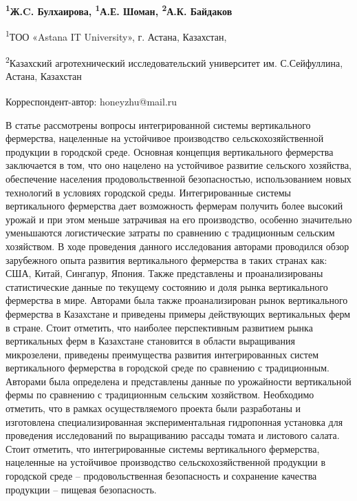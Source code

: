 
\begin{articleheader}

{\bfseries
\textsuperscript{1}Ж.C. Булхаирова\textsuperscript{\envelope },
\textsuperscript{1}А.Е. Шоман,
\textsuperscript{2}А.К. Байдаков
}
\end{articleheader}

\begin{affiliation}
\textsuperscript{1}ТОО «Astana IT University», г. Астана, Казахстан,

\textsuperscript{2}Казахский агротехнический исследовательский университет им. С.Сейфуллина, Астана, Казахстан

\raggedright \textsuperscript{\envelope }Корреспондент-автор: honeyzhu@mail.ru
\end{affiliation}

В статье рассмотрены вопросы интегрированной системы вертикального
фермерства, нацеленные на устойчивое производство сельскохозяйственной
продукции в городской среде. Основная концепция вертикального фермерства
заключается в том, что оно нацелено на устойчивое развитие сельского
хозяйства, обеспечение населения продовольственной безопасностью,
использованием новых технологий в условиях городской среды.
Интегрированные системы вертикального фермерства дает возможность
фермерам получить более высокий урожай и при этом меньше затрачивая на
его производство, особенно значительно уменьшаются логистические затраты
по сравнению с традиционным сельским хозяйством. В ходе проведения
данного исследования авторами проводился обзор зарубежного опыта
развития вертикального фермерства в таких странах как: США, Китай,
Сингапур, Япония. Также представлены и проанализированы статистические
данные по текущему состоянию и доля рынка вертикального фермерства в
мире. Авторами была также проанализирован рынок вертикального фермерства
в Казахстане и приведены примеры действующих вертикальных ферм в стране.
Стоит отметить, что наиболее перспективным развитием рынка вертикальных
ферм в Казахстане становится в области выращивания микрозелени,
приведены преимущества развития интегрированных систем вертикального
фермерства в городской среде по сравнению с традиционным. Авторами была
определена и представлены данные по урожайности вертикальной фермы по
сравнению с традиционным сельским хозяйством. Необходимо отметить, что в
рамках осуществляемого проекта были разработаны и изготовлена
специализированная экспериментальная гидропонная установка для
проведения исследований по выращиванию рассады томата и листового
салата. Стоит отметить, что интегрированные системы вертикального
фермерства, нацеленные на устойчивое производство сельскохозяйственной
продукции в городской среде -- продовольственная безопасность и
сохранение качества продукции -- пищевая безопасность.

